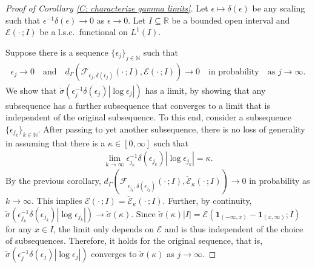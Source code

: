 \documentclass[12pt]{amsart}
\begin{document}
\begin{proof}[Proof of Corollary \ref{C: characterize gamma limits}] Let $\epsilon \mapsto \delta(\epsilon)$ be any scaling such that $\epsilon^{-1}\delta(\epsilon) \to 0$ as $\epsilon \to 0$.  Let $I \subseteq \mathbb{R}$ be a bounded open interval and $\mathscr{E}(\cdot \, ; I )$ be a l.s.c.\ functional on $L^{1}(I)$.

Suppose there is a sequence $\{\epsilon_{j}\}_{j \in \mathbb{N}}$ such that 
    \begin{align*}
    \epsilon_{j} \to 0 \quad \text{and} \quad d_{\Gamma}( \mathscr{F}_{\epsilon_{j},\delta(\epsilon_{j})}( \cdot \, ; I ) , \mathscr{E} ( \cdot \, ; I ) ) \to 0 \quad \text{in probability} \quad \text{as} \, \, j \to \infty.
    \end{align*}
    We show that $ \check{\sigma} ( \epsilon_{j}^{-1} \delta(\epsilon_{j}) | \log \epsilon_{j} | ) $ has a limit, by showing that any subsequence has a further subsequence that converges to a limit that is independent of the original subsequence. To this end, consider a subsequence $\{\epsilon_{j_{k}}\}_{k \in \mathbb{N}}$.  After passing to yet another subsequence, there is no loss of generality in assuming that there is a $\kappa \in [0,\infty]$ such that 
    \begin{align*}
        \lim_{ k \to \infty } \epsilon_{j_{k}}^{-1} \delta(\epsilon_{j_{k}}) | \log \epsilon_{j_{k}} | = \kappa . 
    \end{align*}
By the previous corollary, $d_{\Gamma}( \mathscr{F}_{\epsilon_{j_{k}},\delta(\epsilon_{j_{k}})} ( \cdot \, ; I ) , \check{\mathscr{E}}_{\kappa}(\cdot \, ; I ) ) \to 0$ in probability as $k \to \infty$.  This implies $\mathscr{E}( \cdot \, ; I ) = \check{\mathscr{E}}_{\kappa}(\cdot \, ; I )$.  Further, by continuity, $\check{\sigma}(\epsilon_{j_{k}}^{-1} \delta(\epsilon_{j_{k}}) | \log \epsilon_{j_{k}} |) \to \check{\sigma}(\kappa)$. Since $ \check{\sigma}(\kappa) | I | = \mathscr{E} ( \boldsymbol{1}_{ ( - \infty, x ) } - \boldsymbol{1}_{ ( x, \infty ) }; I ) $ for any $x \in I$, the limit only depends on $ \mathscr{E} $ and is thus independent of the choice of subsequences. Therefore, it holds for the original sequence, that is, $\check{\sigma}(\epsilon_{j}^{-1} \delta(\epsilon_{j}) | \log \epsilon_{j} | )$ converges to $\check{\sigma}(\kappa)$ as $j \to \infty$.


\end{proof}
\end{document}
